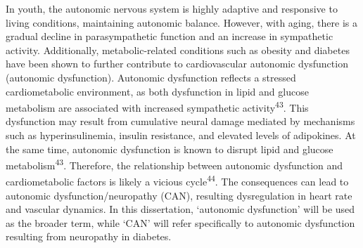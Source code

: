 \documentclass[
  a4paper,
  headsepline=true,
  open=any]{scrbook}
\begin{document}
In youth, the autonomic nervous system is highly adaptive and responsive
to living conditions, maintaining autonomic balance. However, with
aging, there is a gradual decline in parasympathetic function and an
increase in sympathetic activity. Additionally, metabolic-related
conditions such as obesity and diabetes have been shown to further
contribute to cardiovascular autonomic dysfunction (autonomic
dysfunction). Autonomic dysfunction reflects a stressed cardiometabolic
environment, as both dysfunction in lipid and glucose metabolism are
associated with increased sympathetic activity\textsuperscript{43}. This
dysfunction may result from cumulative neural damage mediated by
mechanisms such as hyperinsulinemia, insulin resistance, and elevated
levels of adipokines. At the same time, autonomic dysfunction is known
to disrupt lipid and glucose metabolism\textsuperscript{43}. Therefore,
the relationship between autonomic dysfunction and cardiometabolic
factors is likely a vicious cycle\textsuperscript{44}. The consequences
can lead to autonomic dysfunction/neuropathy (CAN), resulting
dysregulation in heart rate and vascular dynamics. In this dissertation,
`autonomic dysfunction' will be used as the broader term, while `CAN'
will refer specifically to autonomic dysfunction resulting from
neuropathy in diabetes.
\end{document}
